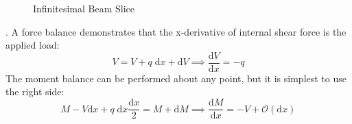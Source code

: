 %
\begin{figure}[htbp]
  \centering
  
  \caption{Infinitesimal Beam Slice}
  \label{fig:Infinitesimal}
\end{figure}
%
. A force balance demonstrates that the x-derivative of internal shear force is the applied load:
\begin{equation}
\label{eq:EulerShear}
V = V + q\;\text{d}x + \text{d}V \implies \frac{\text{d}V}{\text{d}x} = -q
\end{equation}
The moment balance can be performed about any point, but it is simplest to use the right side:
\begin{equation}
\label{eq:EulerMoment}
M - V\text{d}x +q\;\text{d}x\frac{\text{d}x}{2} = M + \text{d}M \implies \frac{\text{d} M}{\text{d}x} = -V + \mathcal{O}(\text{d}x)
\end{equation}


